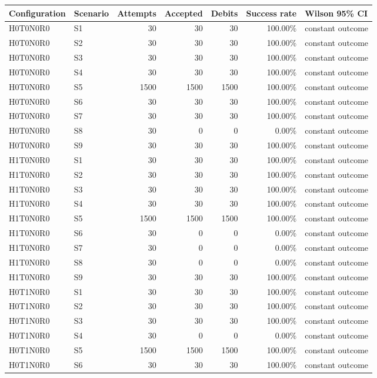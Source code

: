 \begin{tabular}{llrrrrl}
\toprule
Configuration & Scenario & Attempts & Accepted & Debits & Success rate & Wilson 95\% CI \\
\midrule
H0T0N0R0 & S1 & 30 & 30 & 30 & 100.00\% & constant outcome \\
H0T0N0R0 & S2 & 30 & 30 & 30 & 100.00\% & constant outcome \\
H0T0N0R0 & S3 & 30 & 30 & 30 & 100.00\% & constant outcome \\
H0T0N0R0 & S4 & 30 & 30 & 30 & 100.00\% & constant outcome \\
H0T0N0R0 & S5 & 1500 & 1500 & 1500 & 100.00\% & constant outcome \\
H0T0N0R0 & S6 & 30 & 30 & 30 & 100.00\% & constant outcome \\
H0T0N0R0 & S7 & 30 & 30 & 30 & 100.00\% & constant outcome \\
H0T0N0R0 & S8 & 30 & 0 & 0 & 0.00\% & constant outcome \\
H0T0N0R0 & S9 & 30 & 30 & 30 & 100.00\% & constant outcome \\
H1T0N0R0 & S1 & 30 & 30 & 30 & 100.00\% & constant outcome \\
H1T0N0R0 & S2 & 30 & 30 & 30 & 100.00\% & constant outcome \\
H1T0N0R0 & S3 & 30 & 30 & 30 & 100.00\% & constant outcome \\
H1T0N0R0 & S4 & 30 & 30 & 30 & 100.00\% & constant outcome \\
H1T0N0R0 & S5 & 1500 & 1500 & 1500 & 100.00\% & constant outcome \\
H1T0N0R0 & S6 & 30 & 0 & 0 & 0.00\% & constant outcome \\
H1T0N0R0 & S7 & 30 & 0 & 0 & 0.00\% & constant outcome \\
H1T0N0R0 & S8 & 30 & 0 & 0 & 0.00\% & constant outcome \\
H1T0N0R0 & S9 & 30 & 30 & 30 & 100.00\% & constant outcome \\
H0T1N0R0 & S1 & 30 & 30 & 30 & 100.00\% & constant outcome \\
H0T1N0R0 & S2 & 30 & 30 & 30 & 100.00\% & constant outcome \\
H0T1N0R0 & S3 & 30 & 30 & 30 & 100.00\% & constant outcome \\
H0T1N0R0 & S4 & 30 & 0 & 0 & 0.00\% & constant outcome \\
H0T1N0R0 & S5 & 1500 & 1500 & 1500 & 100.00\% & constant outcome \\
H0T1N0R0 & S6 & 30 & 30 & 30 & 100.00\% & constant outcome \\

\end{tabular}
